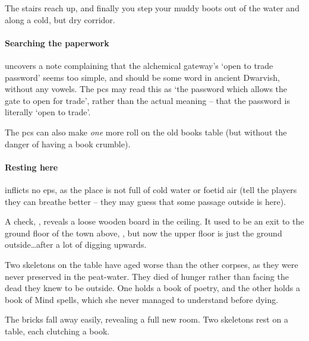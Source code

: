 \begin{boxtext}
  The stairs reach up, and finally you step your muddy boots out of the water and along a cold, but dry corridor.
\end{boxtext}

\paragraph{Searching the paperwork}
uncovers a note complaining that the alchemical gateway's `open to trade password' seems too simple, and should be some word in ancient Dwarvish, without any vowels.
The \glspl{pc} may read this as `the password which allows the gate to open for trade', rather than the actual meaning -- that the password is literally `open to trade'.

The \glspl{pc} can also make \emph{one} more roll on the old books table  (but without the danger of having a book crumble).

\paragraph{Resting here}
inflicts no \glspl{ep}, as the place is not full of cold water or foetid air (tell the players they can breathe better -- they may guess that some passage outside is here).

A  check, \tn[10], reveals a loose wooden board in the ceiling.
It used to be an exit to the ground floor of the town above, , but now the upper floor is just the ground outside\ldots after a lot of digging upwards.



  Two skeletons on the table have aged worse than the other corpses, as they were never preserved in the peat-water.
  They died of hunger rather than facing the dead they knew to be outside.
  One holds a book of poetry, and the other holds a book of Mind spells, which she never managed to understand before dying.

\begin{boxtext}
  The bricks fall away easily, revealing a full new room.  Two skeletons rest on a table, each clutching a book.
\end{boxtext}

